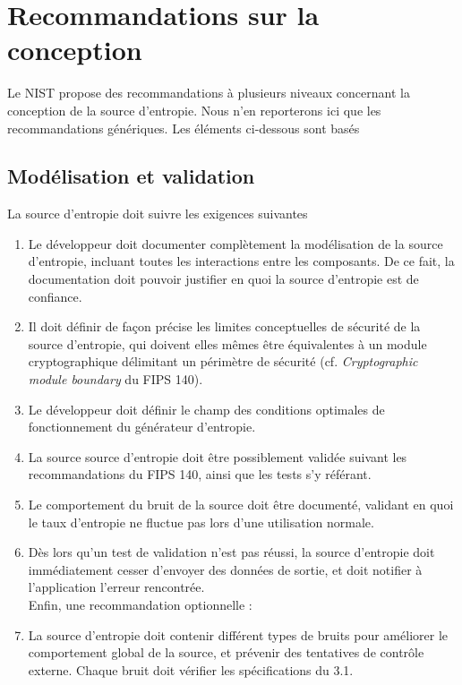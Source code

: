 \section{Recommandations sur la conception}
Le NIST propose des recommandations à plusieurs niveaux concernant la conception de la source d'entropie. Nous n'en reporterons ici que les recommandations génériques. Les éléments ci-dessous sont basés 

\subsection{Modélisation et validation}
La source d'entropie doit suivre les exigences suivantes 
\begin{enumerate}
\item Le développeur doit documenter complètement la modélisation de la source d'entropie, incluant toutes les interactions entre les composants. De ce fait, la documentation doit pouvoir justifier en quoi la source d'entropie est de confiance. 
\item Il doit définir de façon précise les limites conceptuelles de sécurité de la source d'entropie, qui doivent elles mêmes être équivalentes à un module cryptographique délimitant un périmètre de sécurité (cf. \textit{Cryptographic module boundary} du FIPS 140).
\item Le développeur doit définir le champ des conditions optimales de fonctionnement du générateur d'entropie.
\item La source source d'entropie doit être possiblement validée suivant les recommandations du FIPS 140, ainsi que les tests s'y référant.
\item Le comportement du bruit de la source doit être documenté, validant en quoi le taux d'entropie ne fluctue pas lors d'une utilisation normale.
\item Dès lors qu'un test de validation n'est pas réussi, la source d'entropie doit immédiatement cesser d'envoyer des données de sortie, et doit notifier à l'application l'erreur rencontrée.\\

Enfin, une recommandation optionnelle : 
\item La source d'entropie doit contenir différent types de bruits pour améliorer le comportement global de la source, et prévenir des tentatives de contrôle externe. Chaque bruit doit vérifier les spécifications du 3.1. 
\end{enumerate}

